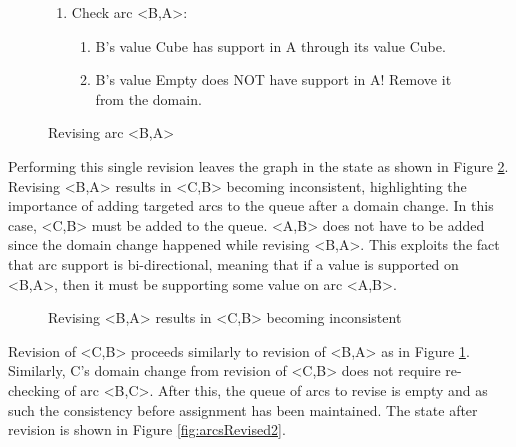 \begin{figure}[H]
    \begin{framed}
    \begin{enumerate}
        \item Check arc <B,A>:
        \begin{enumerate}
            \item B's value Cube has support in A through its value Cube.
            \item B's value Empty does NOT have support in A! Remove it from the domain.
        \end{enumerate}
    \end{enumerate}
    \end{framed}
    \caption{Revising arc <B,A>}
    \label{fig:arcRevision}
\end{figure}

Performing this single revision leaves the graph in the state as shown in Figure \ref{fig:arcsRevised1}. Revising <B,A> results in <C,B> becoming inconsistent, highlighting the importance of adding targeted arcs to the queue after a domain change. In this case, <C,B> must be added to the queue. <A,B> does not have to be added since the domain change happened while revising <B,A>. This exploits the fact that arc support is bi-directional, meaning that if a value is supported on <B,A>, then it must be supporting some value on arc <A,B>.

\begin{figure}[H]
    \centering
    
    \caption{Revising <B,A> results in <C,B> becoming inconsistent}
    \label{fig:arcsRevised1}
\end{figure}

 Revision of <C,B> proceeds similarly to revision of <B,A> as in Figure \ref{fig:arcRevision}. Similarly, C's domain change from revision of <C,B> does not require re-checking of arc <B,C>. After this, the queue of arcs to revise is empty and as such the consistency before assignment has been maintained. The state after revision is shown in Figure \ref{fig:arcsRevised2}.

